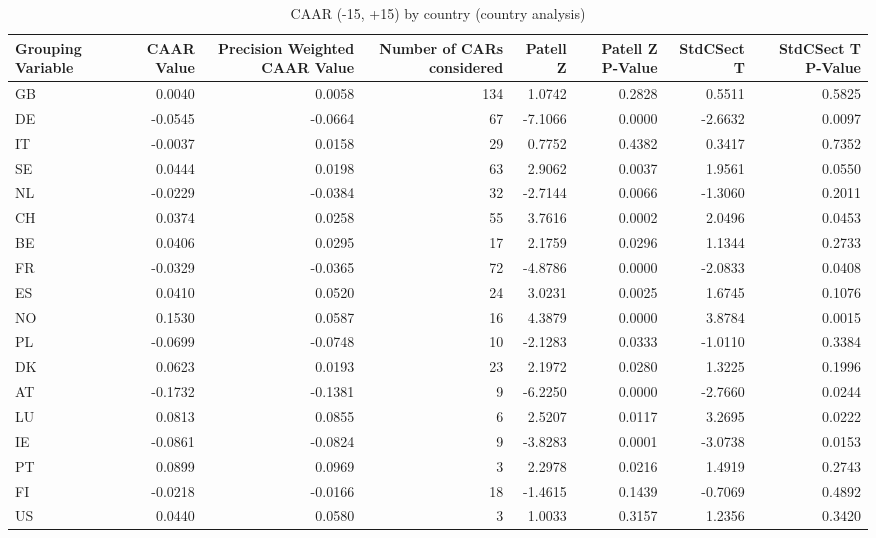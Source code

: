 \begin{table}
\caption{CAAR (-15, +15) by country (country analysis)}
\label{tab:country_caar}
\begin{tabular}{lrrrrrrr}
\toprule
Grouping Variable & CAAR Value & Precision Weighted CAAR Value & Number of CARs considered & Patell Z & Patell Z P-Value & StdCSect T & StdCSect T P-Value \\
\midrule
GB & 0.0040 & 0.0058 & 134 & 1.0742 & 0.2828 & 0.5511 & 0.5825 \\
DE & -0.0545 & -0.0664 & 67 & -7.1066 & 0.0000 & -2.6632 & 0.0097 \\
IT & -0.0037 & 0.0158 & 29 & 0.7752 & 0.4382 & 0.3417 & 0.7352 \\
SE & 0.0444 & 0.0198 & 63 & 2.9062 & 0.0037 & 1.9561 & 0.0550 \\
NL & -0.0229 & -0.0384 & 32 & -2.7144 & 0.0066 & -1.3060 & 0.2011 \\
CH & 0.0374 & 0.0258 & 55 & 3.7616 & 0.0002 & 2.0496 & 0.0453 \\
BE & 0.0406 & 0.0295 & 17 & 2.1759 & 0.0296 & 1.1344 & 0.2733 \\
FR & -0.0329 & -0.0365 & 72 & -4.8786 & 0.0000 & -2.0833 & 0.0408 \\
ES & 0.0410 & 0.0520 & 24 & 3.0231 & 0.0025 & 1.6745 & 0.1076 \\
NO & 0.1530 & 0.0587 & 16 & 4.3879 & 0.0000 & 3.8784 & 0.0015 \\
PL & -0.0699 & -0.0748 & 10 & -2.1283 & 0.0333 & -1.0110 & 0.3384 \\
DK & 0.0623 & 0.0193 & 23 & 2.1972 & 0.0280 & 1.3225 & 0.1996 \\
AT & -0.1732 & -0.1381 & 9 & -6.2250 & 0.0000 & -2.7660 & 0.0244 \\
LU & 0.0813 & 0.0855 & 6 & 2.5207 & 0.0117 & 3.2695 & 0.0222 \\
IE & -0.0861 & -0.0824 & 9 & -3.8283 & 0.0001 & -3.0738 & 0.0153 \\
PT & 0.0899 & 0.0969 & 3 & 2.2978 & 0.0216 & 1.4919 & 0.2743 \\
FI & -0.0218 & -0.0166 & 18 & -1.4615 & 0.1439 & -0.7069 & 0.4892 \\
US & 0.0440 & 0.0580 & 3 & 1.0033 & 0.3157 & 1.2356 & 0.3420 \\
\bottomrule
\end{tabular}
\end{table}
